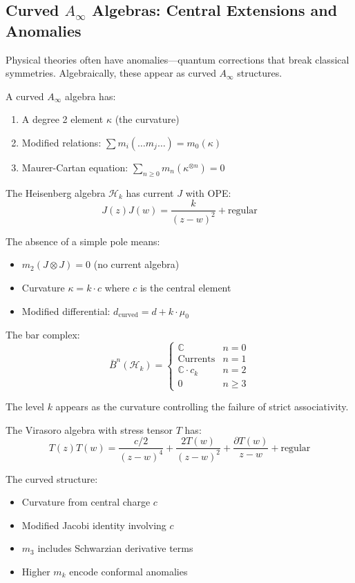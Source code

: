 \subsection{Curved $A_\infty$ Algebras: Central Extensions and Anomalies}

Physical theories often have anomalies—quantum corrections that break classical symmetries. Algebraically, these appear as curved $A_\infty$ structures.

\begin{definition}
A curved $A_\infty$ algebra has:
\begin{enumerate}
\item A degree 2 element $\kappa$ (the curvature)
\item Modified relations: $\sum m_i(\ldots m_j \ldots) = m_0(\kappa)$
\item Maurer-Cartan equation: $\sum_{n \geq 0} m_n(\kappa^{\otimes n}) = 0$
\end{enumerate}
\end{definition}

\begin{example}
The Heisenberg algebra $\mathcal{H}_k$ has current $J$ with OPE:
$$J(z)J(w) = \frac{k}{(z-w)^2} + \text{regular}$$

The absence of a simple pole means:
\begin{itemize}
\item $m_2(J \otimes J) = 0$ (no current algebra)
\item Curvature $\kappa = k \cdot c$ where $c$ is the central element
\item Modified differential: $d_{\text{curved}} = d + k \cdot \mu_0$
\end{itemize}

The bar complex:
$$\bar{B}^n(\mathcal{H}_k) = \begin{cases}
\mathbb{C} & n = 0 \\
\text{Currents} & n = 1 \\
\mathbb{C} \cdot c_k & n = 2 \\
0 & n \geq 3
\end{cases}$$

The level $k$ appears as the curvature controlling the failure of strict associativity.
\end{example}

\begin{example}
The Virasoro algebra with stress tensor $T$ has:
$$T(z)T(w) = \frac{c/2}{(z-w)^4} + \frac{2T(w)}{(z-w)^2} + \frac{\partial T(w)}{z-w} + \text{regular}$$

The curved structure:
\begin{itemize}
\item Curvature from central charge $c$
\item Modified Jacobi identity involving $c$
\item $m_3$ includes Schwarzian derivative terms
\item Higher $m_k$ encode conformal anomalies
\end{itemize}
\end{example}


